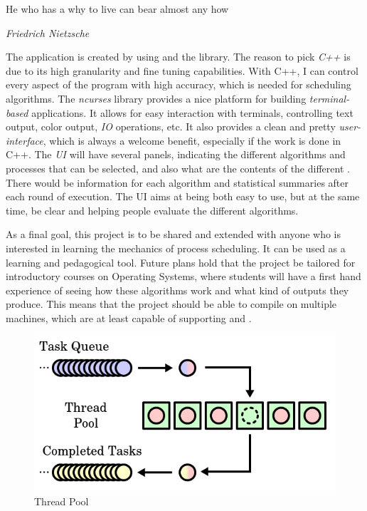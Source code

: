 \documentclass{article}
\newcommand{\code}[1]{\codeinline{\texttt{#1}}}
\begin{document}
\epigraph{He who has a why to live can bear almost any how}{\textit{Friedrich Nietzsche}}

The application is created by using \code{C++} and the \code{ncurses} library. The reason to pick \textit{C++} is due to its high granularity and fine tuning capabilities. With C++, I can control every aspect of the program with high accuracy, which is needed for scheduling algorithms. The \textit{ncurses} library provides a nice platform for building \textit{terminal-based} applications. It allows for easy interaction with terminals, controlling text output, color output, \textit{IO} operations, etc. It also provides a clean and pretty \textit{user-interface}, which is always a welcome benefit, especially if the work is done in C++. The \textit{UI} will have several panels, indicating the different algorithms and processes that can be selected, and also what are the contents of the different \code{queues}. There would be information for each algorithm and statistical summaries after each round of execution. The UI aims at being both easy to use, but at the same time, be clear and helping people evaluate the different algorithms.

As a final goal, this project is to be shared and extended with anyone who is interested in learning the mechanics of process scheduling. It can be used as a learning and pedagogical tool. Future plans hold that the project be tailored for introductory courses on Operating Systems, where students will have a first hand experience of seeing how these algorithms work and what kind of outputs they produce. This means that the project should be able to compile on multiple machines, which are at least capable of supporting \code{C++ 11} and \code{ncurses}.

\begin{figure}[H]
  \includegraphics[width=\linewidth]{./pics/thread_pool.png}
  \caption{Thread Pool}
  \label{fig:Thread Pool}
\end{figure}
\end{document}
